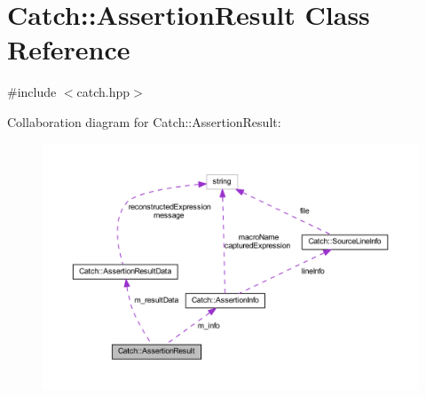 \hypertarget{class_catch_1_1_assertion_result}{}\section{Catch\+:\+:Assertion\+Result Class Reference}
\label{class_catch_1_1_assertion_result}


{\ttfamily \#include $<$catch.\+hpp$>$}



Collaboration diagram for Catch\+:\+:Assertion\+Result\+:\nopagebreak
\begin{figure}[H]
\begin{center}
\leavevmode
\includegraphics[width=350pt]{class_catch_1_1_assertion_result__coll__graph}
\end{center}
\end{figure}

